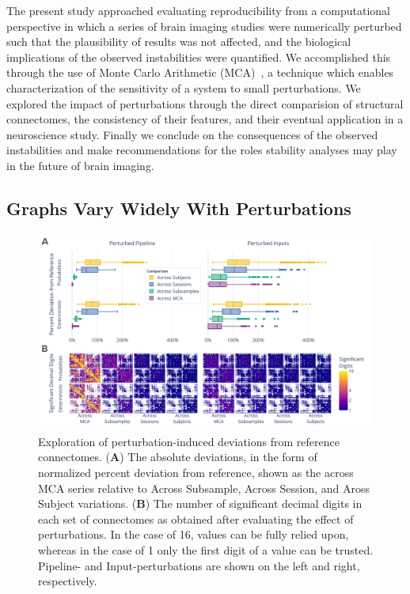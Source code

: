 \documentclass[fleqn,10pt]{SelfArx} %
\begin{document}
The present study approached evaluating reproducibility from a computational perspective in which a series of brain
imaging studies were numerically perturbed such that the plausibility of results was not affected, and the biological
implications of the observed instabilities were quantified. We accomplished this through the use of Monte Carlo
Arithmetic (MCA)~\cite{Parker1997-qq}, a technique which enables characterization of the sensitivity of a system to
small perturbations. We explored the impact of perturbations through the direct comparision of structural connectomes,
the consistency of their features, and their eventual application in a neuroscience study. Finally we conclude on the
consequences of the observed instabilities and make recommendations for the roles stability analyses may play in the
future of brain imaging.

\subsection*{Graphs Vary Widely With Perturbations}
\begin{figure}[hbt]\centering
\includegraphics[width=0.98\linewidth]{figures/fig1_absolute_differences.pdf}
\caption{Exploration of perturbation-induced deviations from reference connectomes.
(\textbf{A}) The absolute deviations, in the form of normalized percent deviation from reference, shown as the
across MCA series relative to Across Subsample, Across Session, and Aross Subject variations.
(\textbf{B}) The number of significant decimal digits in each set of connectomes as obtained after evaluating the
effect of perturbations. In the case of 16, values can be fully relied upon, whereas in the case of 1 only the first
digit of a value can be trusted. Pipeline- and Input-perturbations are shown on the left and right, respectively.}
\label{fig:absolute}
\end{figure}
\end{document}
